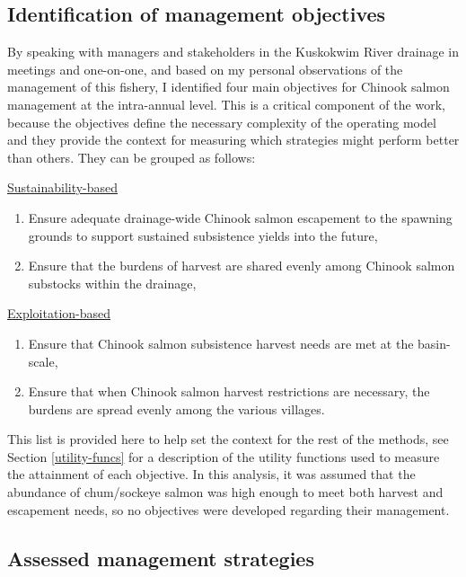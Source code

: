 \documentclass[12pt,]{book}
\theoremstyle{definition}
\theoremstyle{definition}
\theoremstyle{definition}
\theoremstyle{remark}
\begin{document}
\subsection{Identification of management objectives}\label{objectives}

\noindent
By speaking with managers and stakeholders in the Kuskokwim River
drainage in meetings and one-on-one, and based on my personal
observations of the management of this fishery, I identified four main
objectives for Chinook salmon management at the intra-annual level. This
is a critical component of the work, because the objectives define the
necessary complexity of the operating model and they provide the context
for measuring which strategies might perform better than others. They
can be grouped as follows:

\noindent
\underline{Sustainability-based}

\begin{enumerate}
\def\labelenumi{(\arabic{enumi})}
\item
  Ensure adequate drainage-wide Chinook salmon escapement to the
  spawning grounds to support sustained subsistence yields into the
  future,
\item
  Ensure that the burdens of harvest are shared evenly among Chinook
  salmon substocks within the drainage,
\end{enumerate}

\noindent
\underline{Exploitation-based}

\begin{enumerate}
\def\labelenumi{(\arabic{enumi})}
\setcounter{enumi}{2}
\item
  Ensure that Chinook salmon subsistence harvest needs are met at the
  basin-scale,
\item
  Ensure that when Chinook salmon harvest restrictions are necessary,
  the burdens are spread evenly among the various villages.
\end{enumerate}

\noindent
This list is provided here to help set the context for the rest of the
methods, see Section \ref{utility-funcs} for a description of the
utility functions used to measure the attainment of each objective. In
this analysis, it was assumed that the abundance of chum/sockeye salmon
was high enough to meet both harvest and escapement needs, so no
objectives were developed regarding their management.

\subsection{Assessed management strategies}\label{strategies}
\end{document}

